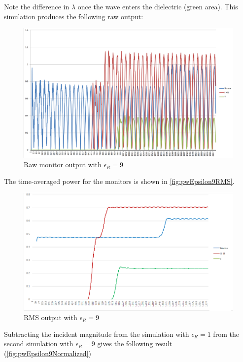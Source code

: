 Note the difference in $\lambda$ once the wave enters the dielectric (green area). This simulation produces the following raw output:

\begin{figure}[H]
	\centering
	\includegraphics[width=\textwidth,
	keepaspectratio]{pw-epsilon-9-raw.png}
	\caption{Raw monitor output with $\epsilon_R = 9$}
	\label{fig:pwEpsilon9Raw}
\end{figure}

The time-averaged power for the monitors is shown in \autoref{fig:pwEpsilon9RMS}.

\begin{figure}[H]
	\centering
	\includegraphics[width=\textwidth,
	keepaspectratio]{pw-epsilon-9-rms.png}
	\caption{RMS output with $\epsilon_R = 9$}
	\label{fig:pwEpsilon9RMS}
\end{figure}

Subtracting the incident magnitude from the simulation with $\epsilon_R = 1$ from the second simulation with $\epsilon_R = 9$ gives the following result (\autoref{fig:pwEpsilon9Normalized})

